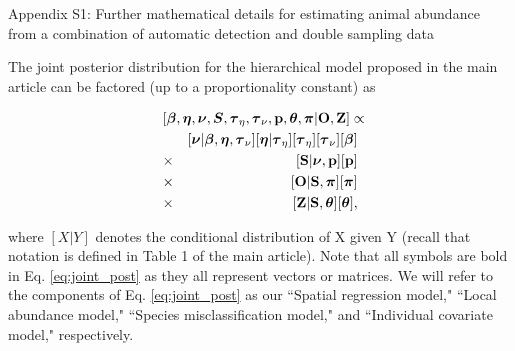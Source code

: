 \documentclass[12pt,fleqn]{article}
\begin{document}
\rm \begin{flushleft}

\raggedbottom

\begin{center}
Appendix S1: Further mathematical details for estimating animal abundance
from a combination of automatic detection and double sampling data
\bigskip
\end{center}

\doublespacing
The joint posterior distribution for the hierarchical model proposed in the main article can be factored (up to a proportionality constant) as
\begin{linenomath*}
\begin{eqnarray}
  \lefteqn{[\boldsymbol{\beta},\boldsymbol{\eta},\boldsymbol{\nu},\boldsymbol{S},\boldsymbol{\tau}_\eta,\boldsymbol{\tau}_\nu,
  {\bf p},\boldsymbol{\theta},\boldsymbol{\pi} | {\bf O},{\bf Z}] \propto }
  \label{eq:joint_post}
  \\
  & & [\boldsymbol{\nu}|\boldsymbol{\beta},\boldsymbol{\eta},\boldsymbol{\tau}_\nu][\boldsymbol{\eta}|\boldsymbol{\tau}_\eta][\boldsymbol{\tau}_\eta][\boldsymbol{\tau}_\nu][\boldsymbol{\beta}] \nonumber \\
  & \times & [{\bf S} | \boldsymbol{\nu}, {\bf p}][{\bf p}] \nonumber \\
  & \times & [{\bf O} | {\bf S},\boldsymbol{\pi}][\boldsymbol{\pi}] \nonumber \\
  & \times & [{\bf Z} | {\bf S},\boldsymbol{\theta}][\boldsymbol{\theta}], \nonumber
\end{eqnarray}
\end{linenomath*}
where $[X|Y]$ denotes the conditional distribution of X given Y (recall that notation is defined in Table 1 of the main article).  Note that all symbols are bold in Eq. \ref{eq:joint_post} as they all represent vectors or matrices.
We will refer to the components of Eq. \ref{eq:joint_post} as our ``Spatial regression model," ``Local abundance model," ``Species misclassification model," and ``Individual covariate model," respectively.


\end{flushleft}
\end{document}
